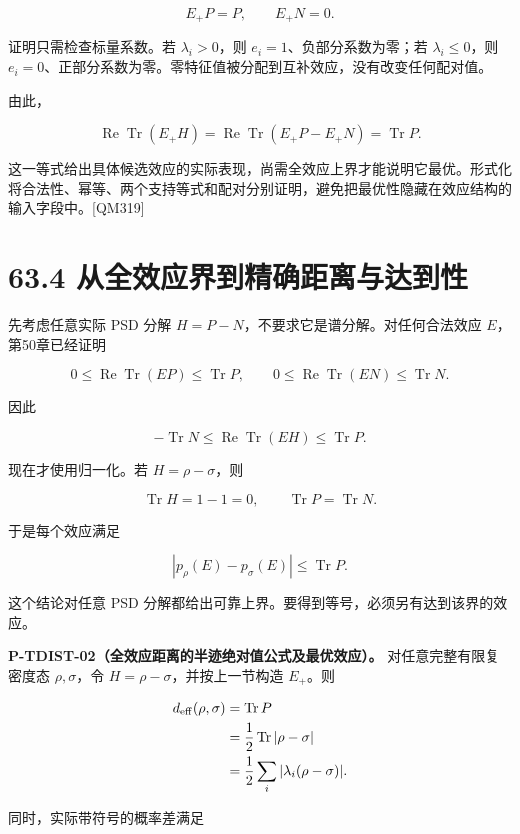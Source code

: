 \documentclass[
  11pt,
  oneside]{book}
\begin{document}
\[
E_+P=P,
\qquad
E_+N=0.
\]

证明只需检查标量系数。若 \(\lambda_i>0\)，则
\(e_i=1\)、负部分系数为零；若 \(\lambda_i\le0\)，则
\(e_i=0\)、正部分系数为零。零特征值被分配到互补效应，没有改变任何配对值。

由此，

\[
\operatorname{Re}\operatorname{Tr}(E_+H)
=\operatorname{Re}\operatorname{Tr}(E_+P-E_+N)
=\operatorname{Tr}P.
\]

这一等式给出具体候选效应的实际表现，尚需全效应上界才能说明它最优。形式化将合法性、幂等、两个支持等式和配对分别证明，避免把最优性隐藏在效应结构的输入字段中。{[}QM319{]}

\section{63.4 从全效应界到精确距离与达到性}

先考虑任意实际 PSD 分解 \(H=P-N\)，不要求它是谱分解。对任何合法效应
\(E\)，第50章已经证明

\[
0\le\operatorname{Re}\operatorname{Tr}(EP)\le\operatorname{Tr}P,
\qquad
0\le\operatorname{Re}\operatorname{Tr}(EN)\le\operatorname{Tr}N.
\]

因此

\[
-\operatorname{Tr}N
\le\operatorname{Re}\operatorname{Tr}(EH)
\le\operatorname{Tr}P.
\]

现在才使用归一化。若 \(H=\rho-\sigma\)，则

\[
\operatorname{Tr}H=1-1=0,
\qquad
\operatorname{Tr}P=\operatorname{Tr}N.
\]

于是每个效应满足

\[
|p_\rho(E)-p_\sigma(E)|\le\operatorname{Tr}P.
\]

这个结论对任意 PSD
分解都给出可靠上界。要得到等号，必须另有达到该界的效应。

\protect\hypertarget{p-tdist-02}{}{}

\textbf{P-TDIST-02（全效应距离的半迹绝对值公式及最优效应）。}
对任意完整有限复密度态 \(\rho,\sigma\)，令
\(H=\rho-\sigma\)，并按上一节构造 \(E_+\)。则

\[
\begin{aligned}
d_{\rm eff}(\rho,\sigma)
&=\operatorname{Tr}P\\
&=\frac12\operatorname{Tr}|\rho-\sigma|\\
&=\frac12\sum_i|\lambda_i(\rho-\sigma)|.
\end{aligned}
\]

同时，实际带符号的概率差满足
\end{document}
